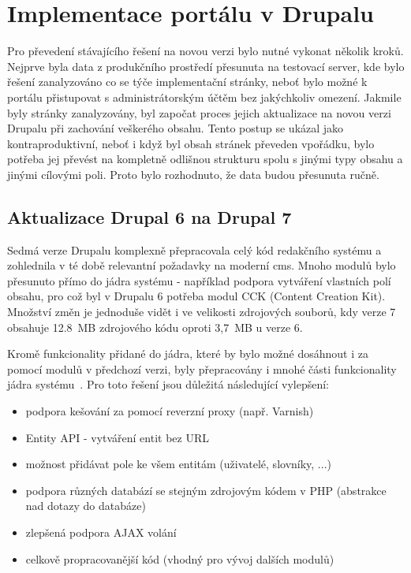 \chapter{Implementace portálu v Drupalu}
\label{chap:implementace-drupal}

Pro převedení stávajícího řešení na novou verzi bylo nutné vykonat několik kroků. Nejprve byla data z produkčního prostředí přesunuta na testovací server, kde bylo řešení zanalyzováno co se týče implementační stránky, neboť bylo možné k portálu přistupovat s administrátorským účtěm bez jakýchkoliv omezení. Jakmile byly stránky zanalyzovány, byl započat proces jejich aktualizace na novou verzi Drupalu při zachování veškerého obsahu. Tento postup se ukázal jako kontraproduktivní, neboť i když byl obsah stránek převeden vpořádku, bylo potřeba jej převést na kompletně odlišnou strukturu spolu s jinými typy obsahu a jinými cílovými poli. Proto bylo rozhodnuto, že data budou přesunuta ručně.

\section{Aktualizace Drupal 6 na Drupal 7}
Sedmá verze Drupalu komplexně přepracovala celý kód redakčního systému a zohlednila v té době relevantní požadavky na moderní \gls{cms}. Mnoho modulů bylo přesunuto přímo do jádra systému - například podpora vytváření vlastních polí obsahu, pro což byl v Drupalu 6 potřeba modul CCK (Content Creation Kit). Množství změn je jednoduše vidět i ve velikosti zdrojových souborů, kdy verze 7 obsahuje 12.8~MB zdrojového kódu oproti 3,7~MB u verze 6.

Kromě funkcionality přidané do jádra, které by bylo možné dosáhnout i za pomocí modulů v předchozí verzi, byly přepracovány i mnohé části funkcionality jádra systému~\cite{website:drupal-comparison}. Pro toto řešení jsou důležitá následující vylepšení:

\begin{itemize}
  \item podpora kešování za pomocí reverzní proxy (např. Varnish)
  \item Entity API - vytváření entit bez URL
  \item možnost přidávat pole ke všem entitám (uživatelé, slovníky, ...)
  \item podpora různých databází se stejným zdrojovým kódem v PHP (abstrakce nad dotazy do databáze)
  \item zlepšená podpora AJAX volání
  \item celkově propracovanější kód (vhodný pro vývoj dalších modulů)
\end{itemize}


